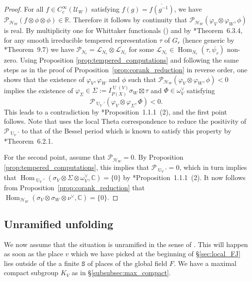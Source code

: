 \documentclass[letterpaper,11pt]{amsart}
\newcommand{\C}{\mathbb{C}}
\newcommand{\R}{\mathbb{R}}
\newcommand{\cH}{\mathcal{H}}
\newcommand{\cL}{\mathcal{L}}
\newcommand{\cP}{\mathcal{P}}
\newcommand{\cU}{\mathcal{U}}
\newcommand{\tS}{\mathtt{S}}
\newcommand{\<}{\negthickspace}
\DeclareMathOperator{\U}{U}
\DeclareMathOperator{\Hom}{Hom}
\theoremstyle{definition}
\theoremstyle{plain}
\theoremstyle{remark}
\numberwithin{equation}{section}
\begin{document}
\begin{proof}
    For all $f \in C_c^\infty(\cU_W)$ satisfying $f(g)=\overline{f(g^{-1})}$, we have $\cP_{\cH_W}(f\otimes \phi \otimes \phi) \in \R$. Therefore it follows by continuity that $\cP_{\cH_W}(\varphi_V \otimes \varphi_W , \phi)$ is real. By multiplicity one for Whittaker functionals (\cite{Ro}) and by \cite{SV}*{Theorem~6.3.4}, for any smooth irreducible tempered representation $\tau$ of $G_r$ (hence generic by \cite{Zel}*{Theorem~9.7}) we have $\cP_{N_r}= \cL_{N_r} \otimes \overline{\cL_{N_r}}$ for some $\cL_{N_r} \in \Hom_{N_r}(\tau,\overline{\psi_r})$ non-zero. Using Proposition \ref{prop:tempered_computations} and following the same steps as in the proof of Proposition~\ref{prop:corank_reduction} in reverse order, one shows that the existence of $\varphi_V, \varphi_W$ and $\phi$ such that $\cP_{\cH_W}(\varphi_V \otimes \varphi_W , \phi)<0$ implies the existence of $\varphi_\Sigma \in \Sigma:=I_{P(X)}^{\U(V)} \sigma_W \boxtimes \tau$ and $\Phi \in \omega^\vee_V$ satisfying
    \begin{equation*}
        \cP_{\U_V'}(\varphi_V \otimes \varphi_\Sigma , \Phi)<0.
    \end{equation*}
    This leads to a contradiction by \cite{Xue2}*{Proposition~1.1.1~(2)}, and the first point follows. Note that \cite{Xue2} uses the local Theta correspondence to reduce the positivity of $\cP_{\U_V'}$ to that of the Bessel period which is known to satisfy this property by \cite{SV}*{Theorem~6.2.1}. 

    For the second point, assume that $\cP_{\cH_W}=0$. By Proposition \ref{prop:tempered_computations}, this implies that $\cP_{\U_V'}=0$, which in turn implies that $\Hom_{\U_V'}(\sigma_V \otimes \Sigma \otimes \omega^\vee_V,\C)=\{0\}$ by \cite{Xue2}*{Proposition~1.1.1~(2)}. It now follows from Proposition~\ref{prop:corank_reduction} that $\Hom_{\cH_W}(\sigma_V \otimes \sigma_W \otimes \nu^\vee,\C) = \{0\}$.
\end{proof}



\subsection{Unramified unfolding}
\label{subsec:unram_unfold}

We now assume that the situation is unramified in the sense of \cite{Boi}. This will happen as soon as the place $v$ which we have picked at the beginning of \S\ref{sec:local_FJ} lies outside of the a finite $\tS$ of places of the global field $F$. We have a maximal compact subgroup $K_V$ as in \S\ref{subsubsec:max_compact}.
\end{document}
